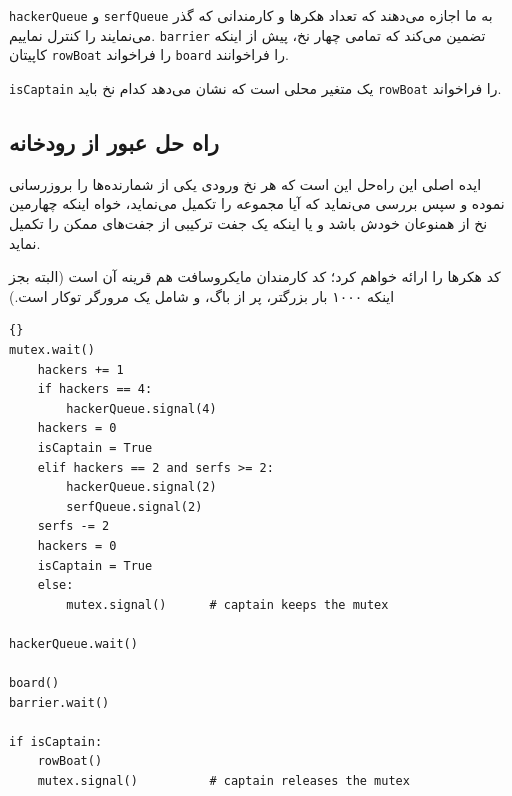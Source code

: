 \documentclass{book}
\newcommand{\clearemptydoublepage}{\newpage\cleardoublepage}
\begin{document}

    {\tt hackerQueue} و {\tt serfQueue}
    به ما اجازه می‌دهند که تعداد هکرها و کارمندانی که گذر می‌نمایند را کنترل نماییم. {\tt barrier} تضمین می‌کند که تمامی چهار نخ، پیش از اینکه 
    کاپیتان  {\tt rowBoat} را فراخواند  {\tt board}  را فراخوانند. 

    {\tt isCaptain} یک متغیر محلی است که نشان می‌دهد کدام نخ باید {\tt rowBoat} را فراخواند. 

\clearemptydoublepage
\subsection {راه حل عبور از رودخانه}

    ایده اصلی این راه‌حل این است که هر نخ ورودی یکی از شمارنده‌ها را بروزرسانی نموده و سپس بررسی می‌نماید که آیا مجموعه را تکمیل می‌نماید، خواه 
    اینکه چهارمین نخ از همنوعان خودش باشد و یا اینکه یک جفت ترکیبی از جفت‌‌های ممکن را تکمیل نماید. 

    کد هکرها را ارائه خواهم کرد؛ کد کارمندان مایکروسافت هم قرینه آن است (البته بجز اینکه ۱۰۰۰ بار بزرگتر، پر از باگ، و شامل یک مرورگر توکار است.)

\begin{latin}
\begin{lstlisting}[title=\rl{راه حل عبور از رودخانه}]{}
mutex.wait()
    hackers += 1
    if hackers == 4:
        hackerQueue.signal(4)                
	hackers = 0
	isCaptain = True
    elif hackers == 2 and serfs >= 2:
        hackerQueue.signal(2)                
        serfQueue.signal(2)                  
	serfs -= 2
	hackers = 0
	isCaptain = True
    else:
        mutex.signal()      # captain keeps the mutex

hackerQueue.wait()           

board()
barrier.wait()            

if isCaptain:
    rowBoat()
    mutex.signal()          # captain releases the mutex
\end{lstlisting}
\end{latin}
\end{document}
